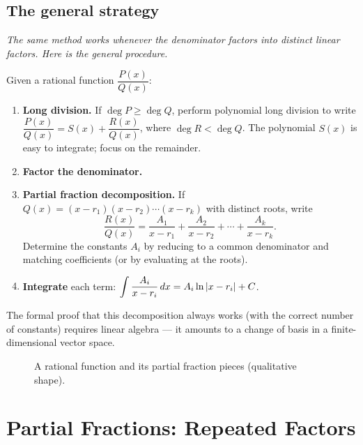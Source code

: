 \subsection*{The general strategy}

\textit{The same method works whenever the denominator factors into distinct linear factors.  Here is the general procedure.}

Given a rational function $\dfrac{P(x)}{Q(x)}$:
\begin{enumerate}
  \item \textbf{Long division.}  If $\deg P \geq \deg Q$, perform polynomial long division to write $\dfrac{P(x)}{Q(x)} = S(x) + \dfrac{R(x)}{Q(x)}$, where $\deg R < \deg Q$.  The polynomial $S(x)$ is easy to integrate; focus on the remainder.
  \item \textbf{Factor the denominator.}
  \item \textbf{Partial fraction decomposition.}  If $Q(x) = (x - r_{1})(x - r_{2})\cdots(x - r_{k})$ with distinct roots, write
  \[
    \frac{R(x)}{Q(x)} = \frac{A_{1}}{x - r_{1}} + \frac{A_{2}}{x - r_{2}} + \cdots + \frac{A_{k}}{x - r_{k}}.
  \]
  Determine the constants $A_{i}$ by reducing to a common denominator and matching coefficients (or by evaluating at the roots).
  \item \textbf{Integrate} each term: $\displaystyle\int \frac{A_{i}}{x - r_{i}}\,dx = A_{i}\ln\left\lvert x - r_{i} \right\rvert + C$.
\end{enumerate}

\begin{remark}
The formal proof that this decomposition always works (with the correct number of constants) requires linear algebra --- it amounts to a change of basis in a finite-dimensional vector space.
\end{remark}

\begin{figure}[ht]
  \centering
  
  \caption{A rational function and its partial fraction pieces (qualitative shape).}
  \label{fig:partial-fractions-decomposition}
\end{figure}

\section{Partial Fractions: Repeated Factors}
\label{sec:9.11}

